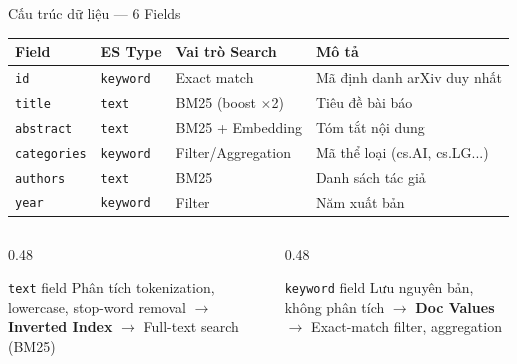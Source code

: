\begin{frame}{Cấu trúc dữ liệu --- 6 Fields}
\centering
\renewcommand{\arraystretch}{1.1}
{\small
\begin{tabular}{l l l p{6cm}}
\toprule
\textbf{Field} & \textbf{ES Type} & \textbf{Vai trò Search} & \textbf{Mô tả} \\
\midrule
\texttt{id} & \texttt{keyword} & Exact match & Mã định danh arXiv duy nhất \\
\texttt{title} & \texttt{text} & BM25 (boost $\times$2) & Tiêu đề bài báo \\
\texttt{abstract} & \texttt{text} & BM25 + Embedding & Tóm tắt nội dung \\
\texttt{categories} & \texttt{keyword} & Filter/Aggregation & Mã thể loại (cs.AI, cs.LG...) \\
\texttt{authors} & \texttt{text} & BM25 & Danh sách tác giả \\
\texttt{year} & \texttt{keyword} & Filter & Năm xuất bản \\
\bottomrule
\end{tabular}
}

\vspace{0.1cm}

\begin{columns}[T]
\begin{column}{0.48\textwidth}
\begin{block}{\texttt{text} field}
{\footnotesize Phân tích tokenization, lowercase, stop-word removal $\to$ \textbf{Inverted Index} $\to$ Full-text search (BM25)}
\end{block}
\end{column}
\begin{column}{0.48\textwidth}
\begin{block}{\texttt{keyword} field}
{\footnotesize Lưu nguyên bản, không phân tích $\to$ \textbf{Doc Values} $\to$ Exact-match filter, aggregation}
\end{block}
\end{column}
\end{columns}
\end{frame}
